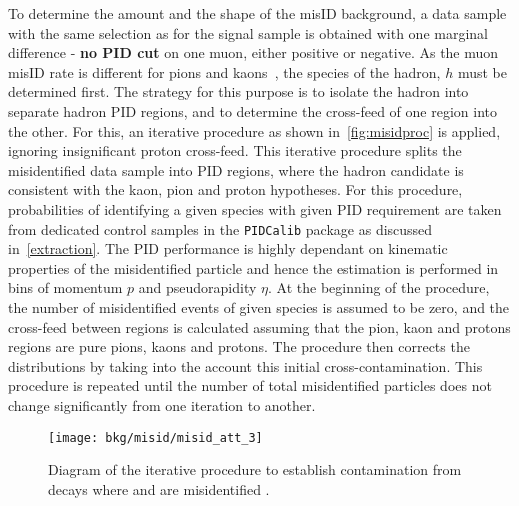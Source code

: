 To determine the amount and the shape of the misID background, a data sample with the same selection as for the signal sample is obtained with one marginal difference - \textbf{no \gls{PID} cut} on one muon, either positive or negative. As the muon misID rate is different for pions and kaons~\cite{LHCb-DP-2013-001}, the species of the hadron, $h$ must be determined \DIFdelbegin {}\DIFdelend first. The strategy for this purpose is to isolate the hadron into separate hadron \gls{PID} regions, and to determine the cross-feed of one region into the other. For this, an iterative procedure as shown in~\autoref{fig:misidproc} is applied, ignoring \DIFaddbegin {}\DIFaddend insignificant proton cross-feed. This iterative procedure splits the misidentified data sample into \gls{PID} regions, where the hadron candidate is consistent with the kaon, pion and proton hypotheses. For this procedure, probabilities of identifying a given species with \DIFaddbegin {}\DIFaddend given \gls{PID} requirement are taken from dedicated control samples in the \texttt{PIDCalib} package \cite{Anderlini:2202412} as discussed in~\autoref{extraction}. The \gls{PID} performance is highly dependant on \DIFaddbegin {}\DIFaddend kinematic properties of the misidentified particle and hence the estimation is performed in bins of momentum $p$ and pseudorapidity $\eta$.
At the beginning of the procedure, the number of misidentified events of \DIFaddbegin {}\DIFaddend given species is assumed to be zero, and the
cross-feed between regions is calculated assuming that the pion, kaon and protons regions are pure pions, kaons and protons.
The procedure then corrects the distributions by taking into the account this initial cross-contamination.
This procedure is repeated until the number of total misidentified particles does not change significantly from one iteration to another.

\begin{figure}[h]
  \begin{center}
    \texttt{[image: bkg/misid/misid\_att\_3]}%
    \vspace*{-0.5cm}
  \end{center}
  \caption{
    Diagram of the iterative procedure to establish contamination from decays where \DIFdelbeginFL {}\DIFdelendFL \DIFaddbeginFL {}\DIFaddendFL and \DIFdelbeginFL {}\DIFdelendFL \DIFaddbeginFL {}\DIFaddendFL are misidentified \DIFdelbeginFL {}\DIFdelendFL \DIFaddbeginFL {}\DIFaddendFL .
    }
  \label{fig:misidproc}
\end{figure}



